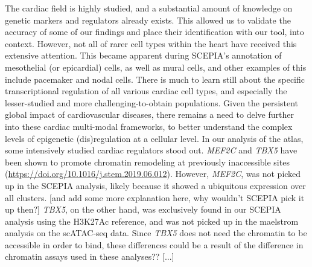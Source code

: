 The cardiac field is highly studied, and a substantial amount of knowledge on genetic markers and regulators already exists. This allowed us to validate the accuracy of some of our findings and place their identification with our tool, into context. However, not all of rarer cell types within the heart have received this extensive attention. This became apparent during SCEPIA's annotation of mesothelial (or epicardial) cells, as well as mural cells, and other examples of this include pacemaker and nodal cells. There is much to learn still about the specific transcriptional regulation of all various cardiac cell types, and especially the lesser-studied and more challenging-to-obtain populations. Given the persistent global impact of cardiovascular diseases\cite{Tsao2023}, there remains a need to delve further into these cardiac multi-modal frameworks, to better understand the complex levels of epigenetic (dis)regulation at a cellular level. In our analysis of the atlas, some intensively studied cardiac regulators stood out. \textit{MEF2C} and \textit{TBX5} have been shown to promote chromatin remodeling at previously inaccessible sites (\href{https://doi.org/10.1016/j.stem.2019.06.012}{https://doi.org/10.1016/j.stem.2019.06.012}). However,  \textit{MEF2C}, was not picked up in the SCEPIA analysis, likely because it showed a ubiquitous expression over all clusters. [and add some more explanation here, why wouldn't SCEPIA pick it up then?] \textit{TBX5}, on the other hand, was exclusively found in our SCEPIA analysis using the H3K27Ac reference, and was not picked up in the maelstrom analysis on the scATAC-seq data. Since \textit{TBX5} does not need the chromatin to be accessible in order to bind, these differences could be a result of the difference in chromatin assays used in these analyses?? [...]
 
